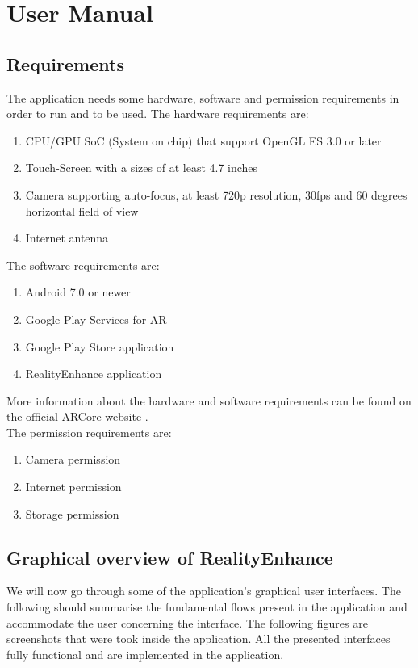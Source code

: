 \chapter{User Manual}\label{cap:evaluation}

\section{Requirements}
The application needs some hardware, software and permission requirements in order to run and to be used. The hardware requirements are:
\begin{enumerate}
    \item CPU/GPU SoC (System on chip) that support OpenGL ES 3.0 or later
    \item Touch-Screen with a sizes of at least 4.7 inches
    \item Camera supporting auto-focus, at least 720p resolution, 30fps and 60 degrees horizontal field of view
    \item Internet antenna
\end{enumerate}
The software requirements are:
\begin{enumerate}
    \item Android 7.0 or newer
    \item Google Play Services for AR
    \item Google Play Store application
    \item RealityEnhance application
\end{enumerate}

More information about the hardware and software requirements can be found on the official ARCore website \cite{ARCoreDevices}.
\\
The permission requirements are:
\begin{enumerate}
    \item Camera permission
    \item Internet permission
    \item Storage permission
\end{enumerate}

\section{Graphical overview of RealityEnhance}
We will now go through some of the application's graphical user interfaces. The following should summarise the fundamental flows present in the application and accommodate the user concerning the interface. The following figures are screenshots that were took inside the application. All the presented interfaces fully functional and are implemented in the application.

